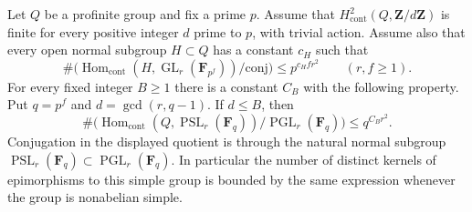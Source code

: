 \begin{proposition}
\label{D:bounded-centre-projective-growth}
Let $Q$ be a profinite group and fix a prime $p$. Assume that
$H^2_{\mathrm{cont}}(Q,\mathbf Z/d\mathbf Z)$ is finite for every
positive integer $d$ prime to $p$, with trivial action. Assume also
that every open normal subgroup $H\subset Q$ has a constant $c_H$
such that
\[
 \#\bigl(\operatorname{Hom}_{\mathrm{cont}}
 (H,\operatorname{GL}_r(\mathbf F_{p^f}))/\mathrm{conj}\bigr)
 \le p^{c_Hfr^2}\qquad(r,f\ge1).
\]
For every fixed integer $B\ge1$ there is a constant $C_B$ with the
following property. Put $q=p^f$ and $d=\gcd(r,q-1)$. If $d\le B$,
then
\[
 \#\bigl(\operatorname{Hom}_{\mathrm{cont}}
 (Q,\operatorname{PSL}_r(\mathbf F_q))/
       \operatorname{PGL}_r(\mathbf F_q)\bigr)
 \le q^{C_Br^2}.
\]
Conjugation in the displayed quotient is through the natural normal
subgroup $\operatorname{PSL}_r(\mathbf F_q)\subset
\operatorname{PGL}_r(\mathbf F_q)$. In particular the number of
distinct kernels of epimorphisms to this simple group is bounded by
the same expression whenever the group is nonabelian simple.
\end{proposition}
